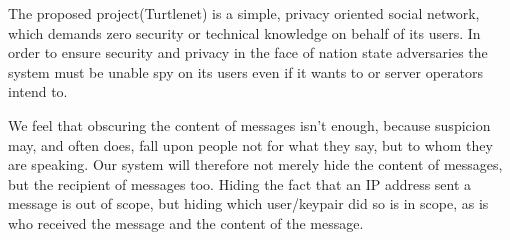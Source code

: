 The proposed project(Turtlenet) is a simple, privacy oriented social
network, which demands zero security or technical knowledge on behalf of its
users. In order to ensure security and privacy in the face of nation state
adversaries the system must be unable spy on its users even if it wants to or
server operators intend to.

We feel that obscuring the content of messages isn't enough, because suspicion
may, and often does, fall upon people not for what they say, but to whom they
are speaking. Our system will therefore not merely hide
the content of messages, but the recipient of messages too. Hiding the fact that
an IP address sent a message is out of scope, but hiding which user/keypair did
so is in scope, as is who received the message and the content of the message.
